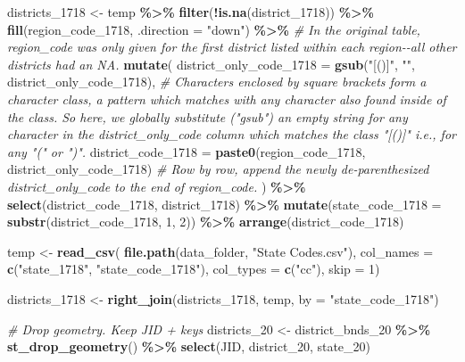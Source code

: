 \documentclass[
]{article}
\newenvironment{Shaded}{\begin{snugshade}}{\end{snugshade}}
\newcommand{\AttributeTok}[1]{\textcolor[rgb]{0.13,0.29,0.53}{#1}}
\newcommand{\CommentTok}[1]{\textcolor[rgb]{0.56,0.35,0.01}{\textit{#1}}}
\newcommand{\DecValTok}[1]{\textcolor[rgb]{0.00,0.00,0.81}{#1}}
\newcommand{\FunctionTok}[1]{\textcolor[rgb]{0.13,0.29,0.53}{\textbf{#1}}}
\newcommand{\NormalTok}[1]{#1}
\newcommand{\OtherTok}[1]{\textcolor[rgb]{0.56,0.35,0.01}{#1}}
\newcommand{\SpecialCharTok}[1]{\textcolor[rgb]{0.81,0.36,0.00}{\textbf{#1}}}
\newcommand{\StringTok}[1]{\textcolor[rgb]{0.31,0.60,0.02}{#1}}
\begin{document}
\begin{Shaded}
\begin{Highlighting}[]
\NormalTok{districts\_1718 }\OtherTok{\textless{}{-}}\NormalTok{ temp }\SpecialCharTok{\%\textgreater{}\%} 
  \FunctionTok{filter}\NormalTok{(}\SpecialCharTok{!}\FunctionTok{is.na}\NormalTok{(district\_1718)) }\SpecialCharTok{\%\textgreater{}\%} 
  \FunctionTok{fill}\NormalTok{(region\_code\_1718, }\AttributeTok{.direction =} \StringTok{"down"}\NormalTok{) }\SpecialCharTok{\%\textgreater{}\%} \CommentTok{\# In the original table, region\_code was only given for the first district listed within each region{-}{-}all other districts had an NA.}
  \FunctionTok{mutate}\NormalTok{(}
    \AttributeTok{district\_only\_code\_1718 =} \FunctionTok{gsub}\NormalTok{(}\StringTok{"[()]"}\NormalTok{, }\StringTok{""}\NormalTok{, district\_only\_code\_1718), }\CommentTok{\# Characters enclosed by square brackets form a character class, a pattern which matches with any character also found inside of the class. So here, we globally substitute ("gsub") an empty string for any character in the district\_only\_code column which matches the class "[()]" i.e., for any "(" or ")".}
    \AttributeTok{district\_code\_1718 =} \FunctionTok{paste0}\NormalTok{(region\_code\_1718, district\_only\_code\_1718) }\CommentTok{\# Row by row, append the newly de{-}parenthesized district\_only\_code to the end of region\_code.}
\NormalTok{  ) }\SpecialCharTok{\%\textgreater{}\%} 
  \FunctionTok{select}\NormalTok{(district\_code\_1718, district\_1718) }\SpecialCharTok{\%\textgreater{}\%} 
  \FunctionTok{mutate}\NormalTok{(}\AttributeTok{state\_code\_1718 =} \FunctionTok{substr}\NormalTok{(district\_code\_1718, }\DecValTok{1}\NormalTok{, }\DecValTok{2}\NormalTok{)) }\SpecialCharTok{\%\textgreater{}\%} 
  \FunctionTok{arrange}\NormalTok{(district\_code\_1718)}

\NormalTok{temp }\OtherTok{\textless{}{-}} \FunctionTok{read\_csv}\NormalTok{(}
  \FunctionTok{file.path}\NormalTok{(data\_folder, }\StringTok{"State Codes.csv"}\NormalTok{),}
  \AttributeTok{col\_names =} \FunctionTok{c}\NormalTok{(}\StringTok{"state\_1718"}\NormalTok{, }\StringTok{"state\_code\_1718"}\NormalTok{),}
  \AttributeTok{col\_types =} \FunctionTok{c}\NormalTok{(}\StringTok{"cc"}\NormalTok{),}
  \AttributeTok{skip =} \DecValTok{1}\NormalTok{)}

\NormalTok{districts\_1718 }\OtherTok{\textless{}{-}} \FunctionTok{right\_join}\NormalTok{(districts\_1718, temp, }\AttributeTok{by =} \StringTok{"state\_code\_1718"}\NormalTok{)}


\CommentTok{\# Drop geometry. Keep JID + keys}
\NormalTok{districts\_20 }\OtherTok{\textless{}{-}}\NormalTok{ district\_bnds\_20 }\SpecialCharTok{\%\textgreater{}\%}
  \FunctionTok{st\_drop\_geometry}\NormalTok{() }\SpecialCharTok{\%\textgreater{}\%}
  \FunctionTok{select}\NormalTok{(JID, district\_20, state\_20)}



\end{Highlighting}
\end{Shaded}
\end{document}
